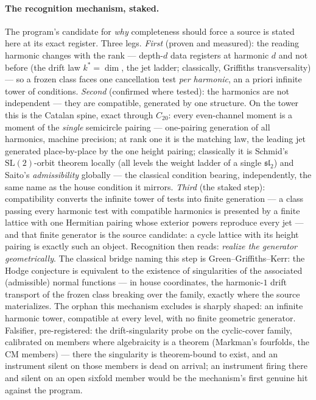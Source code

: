 \documentclass[11pt]{article}
\theoremstyle{definition}
\theoremstyle{remark}
\begin{document}
\paragraph{The recognition mechanism, staked.} The program's candidate for
\emph{why} completeness should force a source is stated here at its exact
register.  Three legs.  \emph{First} (proven and measured): the reading
harmonic changes with the rank --- depth-$d$ data registers at harmonic $d$
and not before (the drift law $k^\ast=\dim$, the jet ladder; classically,
Griffiths transversality) --- so a frozen class faces one cancellation test
\emph{per harmonic}, an a priori infinite tower of conditions.
\emph{Second} (confirmed where tested): the harmonics are not independent ---
they are compatible, generated by one structure.  On the tower this is the
Catalan spine, exact through $C_{20}$: every even-channel moment is a moment
of the \emph{single} semicircle pairing --- one-pairing generation of all
harmonics, machine precision; at rank one it is the matching law, the leading
jet generated place-by-place by the one height pairing; classically it is
Schmid's $\mathrm{SL}(2)$-orbit theorem locally (all levels the weight ladder
of a single $\mathfrak{sl}_2$) and Saito's \emph{admissibility} globally ---
the classical condition bearing, independently, the same name as the house
condition it mirrors.  \emph{Third} (the staked step): compatibility converts
the infinite tower of tests into finite generation --- a class passing every
harmonic test with compatible harmonics is presented by a finite lattice with
one Hermitian pairing whose exterior powers reproduce every jet --- and that
finite generator is the source candidate: a cycle lattice with its height
pairing is exactly such an object.  Recognition then reads: \emph{realize the
generator geometrically}.  The classical bridge naming this step is
Green--Griffiths--Kerr: the Hodge conjecture is equivalent to the existence
of singularities of the associated (admissible) normal functions --- in house
coordinates, the harmonic-$1$ drift transport of the frozen class breaking
over the family, exactly where the source materializes.  The orphan this
mechanism excludes is sharply shaped: an infinite harmonic tower, compatible
at every level, with no finite geometric generator.  Falsifier,
pre-registered: the drift-singularity probe on the cyclic-cover family,
calibrated on members where algebraicity is a theorem (Markman's fourfolds,
the CM members) --- there the singularity is theorem-bound to exist, and an
instrument silent on those members is dead on arrival; an instrument firing
there and silent on an open sixfold member would be the mechanism's first
genuine hit against the program.
\end{document}
